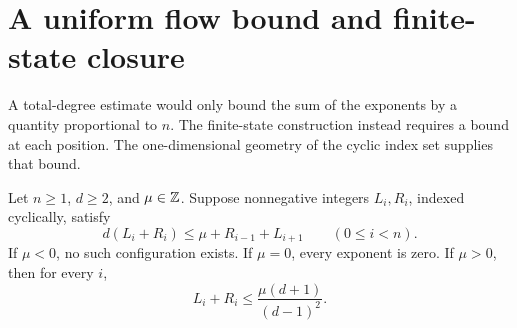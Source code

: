 \section{A uniform flow bound and finite-state closure}\label{sec:flow}

A total-degree estimate would only bound the sum of the exponents by a
quantity proportional to $n$. The finite-state construction instead
requires a bound at each position. The one-dimensional geometry of the
cyclic index set supplies that bound.

\begin{lemma}\label{lem:uniform-flow}
Let $n\ge1$, $d\ge2$, and $\mu\in\mathbb Z$. Suppose nonnegative integers
$L_i,R_i$, indexed cyclically, satisfy
\begin{equation}\label{eq:abstract-flow}
 d(L_i+R_i)\le\mu+R_{i-1}+L_{i+1}
 \qquad(0\le i<n).
\end{equation}
If $\mu<0$, no such configuration exists. If $\mu=0$, every exponent
is zero. If $\mu>0$, then for every $i$,
\begin{equation}\label{eq:uniform-bound}
 L_i+R_i\le\frac{\mu(d+1)}{(d-1)^2}.
\end{equation}
\end{lemma}

